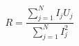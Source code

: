 \documentclass[A4,11pt]{article}
\begin{document}
\thispagestyle{empty}
$$
R = \frac{\sum\limits_{j=1}^N I_jU_j}{\sum\limits_{j=1}^N I_j^2}
$$
\end{document}
